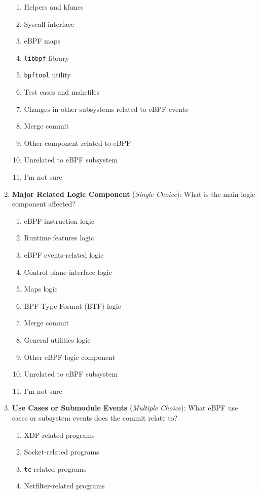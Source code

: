 \documentclass[sigconf,review,anonymous]{acmart}
\begin{document}
\begin{enumerate}
\begin{enumerate}[label=(\alph*)]
        \item Helpers and kfuncs
        \item Syscall interface
        \item eBPF maps
        \item \texttt{libbpf} library
        \item \texttt{bpftool} utility
        \item Test cases and makefiles
        \item Changes in other subsystems related to eBPF events
        \item Merge commit
        \item Other component related to eBPF
        \item Unrelated to eBPF subsystem
        \item I'm not sure
    \end{enumerate}
    \item \textbf{Major Related Logic Component} (\emph{Single Choice}): What is the main logic component affected?
    \begin{enumerate}[label=(\alph*)]
        \item eBPF instruction logic
        \item Runtime features logic
        \item eBPF events-related logic
        \item Control plane interface logic
        \item Maps logic
        \item BPF Type Format (BTF) logic
        \item Merge commit
        \item General utilities logic
        \item Other eBPF logic component
        \item Unrelated to eBPF subsystem
        \item I'm not sure
    \end{enumerate}
    \item \textbf{Use Cases or Submodule Events} (\emph{Multiple Choice}): What eBPF use cases or subsystem events does the commit relate to?
    \begin{enumerate}[label=(\alph*)]
        \item XDP-related programs
        \item Socket-related programs
        \item \texttt{tc}-related programs
        \item Netfilter-related programs

\end{enumerate}
\end{enumerate}
\end{document}
